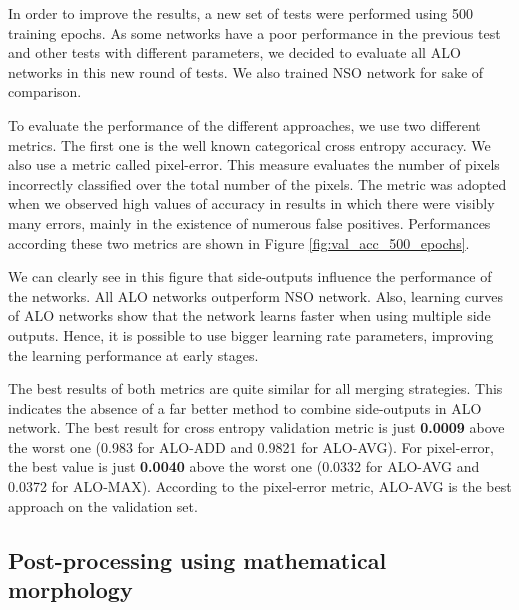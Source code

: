 In order to improve the results, a new set of tests were performed using 500 training epochs. As some networks have a poor performance in the previous test and other tests with different parameters, we decided to evaluate all ALO networks in this new round of tests. We also trained NSO network for sake of comparison.



To evaluate the performance of the different approaches, we use two different metrics. The first one is the well known categorical cross entropy accuracy.
We also use a metric called pixel-error. This measure evaluates the number of pixels incorrectly classified over the total number of the pixels. The metric was adopted when we observed high values of accuracy in results in which there were visibly many errors, mainly in the existence of numerous false positives. Performances according these two metrics are shown in Figure \ref{fig:val_acc_500_epochs}.



We can clearly see in this figure that side-outputs influence the performance of the networks. All ALO networks outperform NSO network. Also, learning curves of ALO networks show that the network learns faster when using multiple side outputs. Hence, it is possible to use bigger learning rate parameters, improving the learning performance at early stages.

The best results of both metrics are quite similar for all merging strategies. This indicates the absence of a far better method to combine side-outputs in ALO network. The best result for cross entropy validation metric is just \textbf{0.0009} above the worst one (0.983 for ALO-ADD and 0.9821 for ALO-AVG). For pixel-error, the best value is just \textbf{0.0040} above the worst one (0.0332 for ALO-AVG and 0.0372 for ALO-MAX). According to the pixel-error metric, ALO-AVG is the best approach on the validation set.


\subsection{Post-processing using mathematical morphology}

